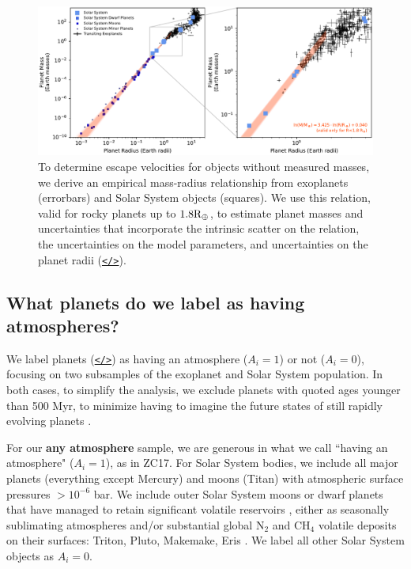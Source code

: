 \documentclass[modern,linenumbers,trackchanges]{aastex7}
\begin{document}
\begin{figure}[ht!]
\includegraphics[width=\textwidth]{figures/mass-radius-relation-for-rocky-planets}
\caption{To determine escape velocities for objects without measured masses, we derive an empirical mass-radius relationship from exoplanets (errorbars) and Solar System objects (squares). We use this relation, valid for rocky planets up to $1.8\rm{R}_\oplus$, to estimate planet masses and uncertainties that incorporate the intrinsic scatter on the relation, the uncertainties on the model parameters, and uncertainties on the planet radii (\href{https://github.com/zkbt/shoreline/blob/main/notebooks/fit-mass-radius-relation.ipynb}{\texttt{</>}}).
}
\label{f:mass-radius}
\end{figure}

\subsection{What planets do we label as having atmospheres?}

We label planets (\href{https://github.com/zkbt/shoreline/blob/main/notebooks/curate-and-label-planets.ipynb}{\texttt{</>}}) as having an atmosphere ($A_i = 1$) or not  ($A_i = 0$), focusing on two subsamples of the exoplanet and Solar System population. In both cases, to simplify the analysis, we exclude planets with quoted ages younger than 500 Myr, to minimize having to imagine the future states of still rapidly evolving planets \citep{lopezUnderstandingMassRadiusRelation2014a, chenEvolutionaryAnalysisGaseous2016b,  thaoFeatherweightGiantUnraveling2024b}. 

For our {\bf any atmosphere} sample, we are generous in what we call ``having an atmosphere" ($A_i = 1$), as in ZC17. For Solar System bodies, we include all major planets (everything except Mercury) and moons (Titan) with atmospheric surface pressures $>10^{-6}$ bar. We include outer Solar System moons or dwarf planets that have managed to retain significant volatile reservoirs \citep{schallerVolatileLossRetention2007}, either as seasonally sublimating atmospheres and/or substantial global N$_2$ and CH$_4$ volatile deposits on their surfaces: Triton, Pluto, Makemake, Eris \citep{youngStructureCompositionPlutos2018, sicardyConstraintsEvolutionTriton2024, grundyModerateRatiosMethane2024}. We label all other Solar System objects as $A_i = 0$.
\end{document}
